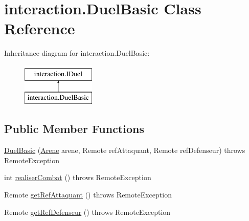 \hypertarget{classinteraction_1_1_duel_basic}{\section{interaction.\-Duel\-Basic Class Reference}
\label{classinteraction_1_1_duel_basic}
}
Inheritance diagram for interaction.\-Duel\-Basic\-:\begin{figure}[H]
\begin{center}
\leavevmode
\includegraphics[height=2.000000cm]{classinteraction_1_1_duel_basic}
\end{center}
\end{figure}
\subsection*{Public Member Functions}
\begin{DoxyCompactItemize}
\item 
\hyperlink{classinteraction_1_1_duel_basic_afafe5b66524270a5acf3c855e896444e}{Duel\-Basic} (\hyperlink{classserveur_1_1_arene}{Arene} arene, Remote ref\-Attaquant, Remote ref\-Defenseur)  throws Remote\-Exception
\item 
int \hyperlink{classinteraction_1_1_duel_basic_a88b42733ab5e32f5334f1c590a6dcd72}{realiser\-Combat} ()  throws Remote\-Exception 
\item 
Remote \hyperlink{classinteraction_1_1_duel_basic_a406cd53e1eb8b51d99bbe8af72fb28d0}{get\-Ref\-Attaquant} ()  throws Remote\-Exception 
\item 
Remote \hyperlink{classinteraction_1_1_duel_basic_a6e7e4b0163230f13aad5ca285f969b6f}{get\-Ref\-Defenseur} ()  throws Remote\-Exception 
\end{DoxyCompactItemize}


